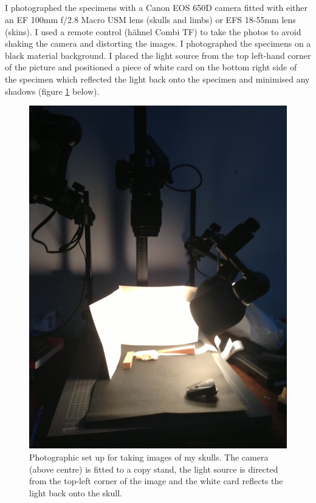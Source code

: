 \subsection{}
I photographed the specimens with a Canon EOS 650D camera fitted with either an EF 100mm f/2.8 Macro USM lens (skulls and limbs) or EFS 18-55mm lens (skins). I used a remote control (h\"ahnel Combi TF) to take the photos to avoid shaking the camera and distorting the images. I photographed the specimens on a black material background. I placed the light source from the top left-hand corner of the picture and positioned a piece of white card on the bottom right side of the specimen which reflected the light back onto the specimen and minimised any shadows (figure \ref{fig:camera} below).

\begin{figure}[h] 
  \centering
  \includegraphics[keepaspectratio=true]{Methods/figures/camera_setup.jpg}
    \caption[Photographic set up]%
    {Photographic set up for taking images of my skulls. The camera (above centre) is fitted to a copy stand, the light source is directed from the top-left corner of the image and the white card reflects the light back onto the skull. }%
  \label{fig:camera}
  \end{figure}
